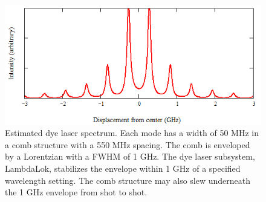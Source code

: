 \begin{figure}
\center
\includegraphics[width=6.00in]
{dye_spectrum/dye_spectrum.png}
\caption[Estimated dye laser spectrum]{Estimated dye laser spectrum. Each mode has a width of 50 MHz in a comb structure with a 550 MHz spacing. The comb is enveloped by a Lorentzian with a FWHM of 1 GHz. The dye laser subsystem, LambdaLok, stabilizes the envelope within 1 GHz of a specified wavelength setting. The comb structure may also slew underneath the 1 GHz envelope from shot to shot.}
\label{dye_spectrum}
\end{figure} 


